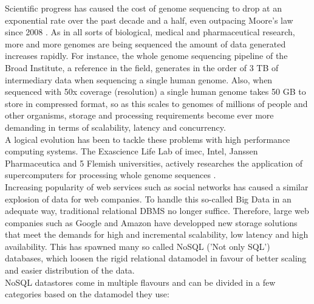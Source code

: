 \documentclass{IEEEtran}
\begin{document}
Scientific progress has caused the cost of genome sequencing to drop at an exponential rate over the past decade and a half, even outpacing Moore's law since 2008 \cite{wetterstrand_sequencing_cost}. As in all sorts of biological, medical and pharmaceutical research, more and more genomes are being sequenced the amount of data generated increases rapidly. For instance, the whole genome sequencing pipeline of the Broad Institute\cite{broad_institute}, a reference in the field, generates in the order of 3 TB of intermediary data when sequencing a single human genome. Also, when sequenced with 50x coverage (resolution) a single human genome takes 50 GB to store in compressed format,
so as this scales to genomes of millions of people and other organisms, storage and processing requirements become ever more demanding in terms of scalability, latency and concurrency.
\\A logical evolution has been to tackle these problems with high performance computing systems. The Exascience Life Lab of imec, Intel, Janssen Pharmaceutica and 5 Flemish universities, actively researches the application of supercomputers for processing whole genome sequences \cite{exascience_life_lab}\cite{lifelab_BWA}.
\\Increasing popularity of web services such as social networks has caused a similar explosion of data for web companies. To handle this so-called Big Data\cite{mashey1997big} in an adequate way, traditional relational DBMS no longer suffice. Therefore, large web companies such as Google and Amazon have developped new storage solutions that meet the demands for high and incremental scalability, low latency and high availability\cite{baker2011megastore}. This has spawned many so called NoSQL ('Not only SQL') databases, which loosen the rigid relational datamodel in favour of better scaling and easier distribution of the data.
\\NoSQL datastores come in multiple flavours and can be divided in a few categories based on the datamodel they use:
\end{document}
